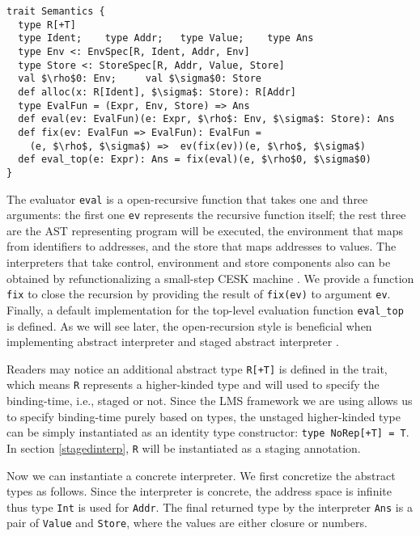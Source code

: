 
\begin{lstlisting}
trait Semantics {
  type R[+T]
  type Ident;    type Addr;   type Value;    type Ans
  type Env <: EnvSpec[R, Ident, Addr, Env]
  type Store <: StoreSpec[R, Addr, Value, Store]
  val $\rho$0: Env;     val $\sigma$0: Store
  def alloc(x: R[Ident], $\sigma$: Store): R[Addr]
  type EvalFun = (Expr, Env, Store) => Ans
  def eval(ev: EvalFun)(e: Expr, $\rho$: Env, $\sigma$: Store): Ans
  def fix(ev: EvalFun => EvalFun): EvalFun = 
    (e, $\rho$, $\sigma$) =>  ev(fix(ev))(e, $\rho$, $\sigma$)
  def eval_top(e: Expr): Ans = fix(eval)(e, $\rho$0, $\sigma$0)
}
\end{lstlisting}

The evaluator \texttt{eval} is a open-recursive function that takes one and three arguments: the first
one \texttt{ev} represents the recursive function itself; the rest three are the AST representing program 
will be executed, the environment that maps from identifiers to addresses, and the store that maps addresses to values.
The interpreters that take control, environment and store components also can be obtained by 
refunctionalizing \cite{DBLP:conf/ppdp/AgerBDM03, Wei:2018:RAA:3243631.3236800} a small-step CESK 
machine \cite{DBLP:conf/popl/FelleisenF87}.
We provide a function \texttt{fix} to close the recursion by providing the result of \texttt{fix(ev)} 
to argument \texttt{ev}. Finally, a default implementation for the top-level evaluation function \texttt{eval\_top} is defined.
As we will see later, the open-recursion style is beneficial when implementing abstract interpreter and 
staged abstract interpreter .

Readers may notice an additional abstract type \texttt{R[+T]} is defined in the trait,
which means \texttt{R} represents a higher-kinded type and will used to specify the binding-time, 
i.e., staged or not. Since the LMS framework we are using allows us to specify binding-time purely
based on types, the unstaged higher-kinded type can be simply instantiated as an identity type constructor: 
\texttt{type NoRep[+T] = T}. In section \ref{stagedinterp}, \texttt{R} will be instantiated 
as a staging annotation. 

Now we can instantiate a concrete interpreter. We first concretize the abstract types as follows.
Since the interpreter is concrete, the address space is infinite thus type \texttt{Int} is used for \texttt{Addr}.
The final returned type by the interpreter \texttt{Ans} is a pair of \texttt{Value} and \texttt{Store}, 
where the values are either closure or numbers.

